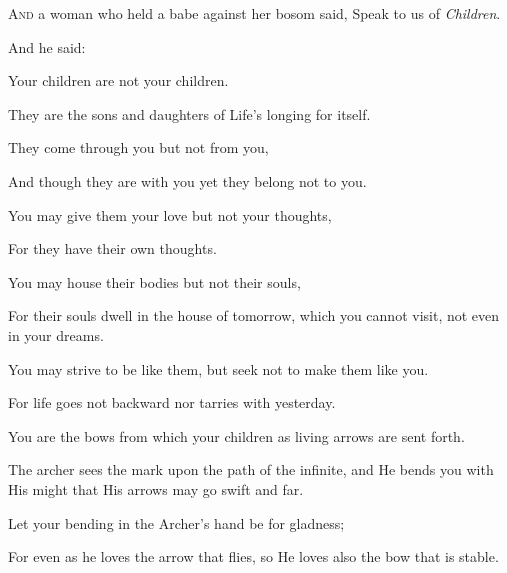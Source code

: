 \noindent
\lettrine{A}{nd} a woman who held a babe against her bosom said, Speak to us of \textit{Children}.\par

\medskip
And he said:

Your children are not your children. 

They are the sons and daughters of Life’s longing for itself. 

They come through you but not from you, 

And though they are with you yet they
belong not to you.

You may give them your love but not your
thoughts,

For they have their own thoughts.

You may house their bodies but not their
souls,

For their souls dwell in the house of
tomorrow, which you cannot visit, not
even in your dreams.

You may strive to be like them, but seek
not to make them like you. 

For life goes not backward nor tarries with
yesterday.

You are the bows from which your
children as living arrows are sent
forth.

The archer sees the mark upon the path
of the infinite, and He bends you with
His might that His arrows may go swift
and far.

Let your bending in the Archer’s hand be
for gladness;

For even as he loves the arrow that
flies, so He loves also the bow that is
stable.